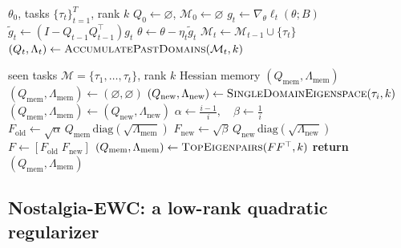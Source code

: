 \begin{algorithm}[tb]
\caption{\textsc{Nostalgia} — sequential constrained optimization}
\label{alg:nostalgia}
\begin{algorithmic}
 $\theta_0$, tasks $\{\tau_t\}_{t=1}^T$, rank $k$
 $Q_0 \leftarrow \varnothing$, $\mathcal{M}_0 \leftarrow \varnothing$
        \STATE $g_t \leftarrow \nabla_\theta \ell_t(\theta; B)$
        \STATE $\tilde g_t \leftarrow (I - Q_{t-1}Q_{t-1}^{\top}) g_t$
        \STATE $\theta \leftarrow \theta - \eta_t \tilde g_t$
    \ENDFOR
    \STATE $\mathcal{M}_t \leftarrow \mathcal{M}_{t-1} \cup \{\tau_t\}$
    \STATE $(Q_t, \Lambda_t) \leftarrow \textsc{AccumulatePastDomains}(\mathcal{M}_t, k)$
\ENDFOR
\end{algorithmic}
\end{algorithm}

\begin{algorithm}[tb]
\caption{\textsc{AccumulatePastDomains}}
\label{alg:accumulate}
\begin{algorithmic}
 seen tasks $\mathcal{M} = \{\tau_1,\dots,\tau_t\}$, rank $k$
 Hessian memory $(Q_{\mathrm{mem}}, \Lambda_{\mathrm{mem}})$
\STATE $(Q_{\mathrm{mem}}, \Lambda_{\mathrm{mem}}) \leftarrow (\varnothing, \varnothing)$
    \STATE $(Q_{\mathrm{new}}, \Lambda_{\mathrm{new}}) \leftarrow \textsc{SingleDomainEigenspace}(\tau_i, k)$
        \STATE $(Q_{\mathrm{mem}}, \Lambda_{\mathrm{mem}}) \leftarrow (Q_{\mathrm{new}}, \Lambda_{\mathrm{new}})$
    \ELSE
        \STATE $\alpha \leftarrow \frac{i-1}{i}, \quad \beta \leftarrow \frac{1}{i}$
        \STATE $F_{\mathrm{old}} \leftarrow \sqrt{\alpha}\, Q_{\mathrm{mem}}\,\mathrm{diag}(\sqrt{\Lambda_{\mathrm{mem}}})$
        \STATE $F_{\mathrm{new}} \leftarrow \sqrt{\beta}\, Q_{\mathrm{new}}\,\mathrm{diag}(\sqrt{\Lambda_{\mathrm{new}}})$
        \STATE $F \leftarrow [F_{\mathrm{old}} \; F_{\mathrm{new}}]$
        \STATE $(Q_{\mathrm{mem}}, \Lambda_{\mathrm{mem}}) \leftarrow \textsc{TopEigenpairs}(FF^\top, k)$
    \ENDIF
\ENDFOR
\STATE \textbf{return} $(Q_{\mathrm{mem}}, \Lambda_{\mathrm{mem}})$
\end{algorithmic}
\end{algorithm}

\subsection{Nostalgia-EWC: a low-rank quadratic regularizer}

